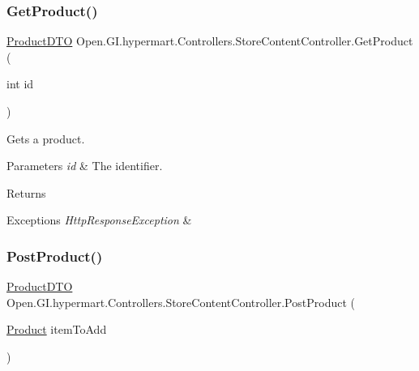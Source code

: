 \subsubsection{\texorpdfstring{Get\+Product()}{GetProduct()}}
{\footnotesize\ttfamily \hyperlink{class_open_1_1_g_i_1_1hypermart_1_1_data_transformation_objects_1_1_product_d_t_o}{Product\+D\+TO} Open.\+G\+I.\+hypermart.\+Controllers.\+Store\+Content\+Controller.\+Get\+Product (\begin{DoxyParamCaption}\item[{int}]{id }\end{DoxyParamCaption})}



Gets a product. 


\begin{DoxyParams}{Parameters}
{\em id} & The identifier.\\
\hline
\end{DoxyParams}
\begin{DoxyReturn}{Returns}

\end{DoxyReturn}

\begin{DoxyExceptions}{Exceptions}
{\em Http\+Response\+Exception} & \\
\hline
\end{DoxyExceptions}
\hypertarget{class_open_1_1_g_i_1_1hypermart_1_1_controllers_1_1_store_content_controller_ac11817b427cdc3139f1a1022791d9697}{}\label{class_open_1_1_g_i_1_1hypermart_1_1_controllers_1_1_store_content_controller_ac11817b427cdc3139f1a1022791d9697} 
\subsubsection{\texorpdfstring{Post\+Product()}{PostProduct()}}
{\footnotesize\ttfamily \hyperlink{class_open_1_1_g_i_1_1hypermart_1_1_data_transformation_objects_1_1_product_d_t_o}{Product\+D\+TO} Open.\+G\+I.\+hypermart.\+Controllers.\+Store\+Content\+Controller.\+Post\+Product (\begin{DoxyParamCaption}\item[{\hyperlink{class_open_1_1_g_i_1_1hypermart_1_1_models_1_1_product}{Product}}]{item\+To\+Add }\end{DoxyParamCaption})}



